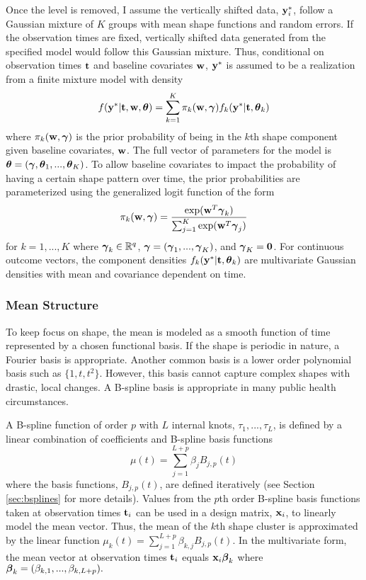 Once the level is removed, I assume the vertically shifted data, $\mathbf y_{i}^{*}$, follow a Gaussian mixture of $K$ groups with mean shape functions and random errors. If the observation times are fixed, vertically shifted data generated from the specified model would follow this Gaussian mixture. Thus, conditional on observation times $\mathbf t$ and baseline covariates $\mathbf w$, $\mathbf y^{*}$ is assumed to be a realization from a finite mixture model with density
\begin{align*}
 f(\mathbf y^{*}|\mathbf t,\mathbf w,\boldsymbol\theta) =  \sum^{K}_{k=1}\pi_{k}(\mathbf w,\boldsymbol \gamma)f_{k}( \mathbf y^{*}|\mathbf t,\boldsymbol\theta_{k})
\end{align*}
where $\pi_{k}(\mathbf w,\boldsymbol \gamma)$ is the prior probability of being in the $k$th shape component given baseline covariates, $\mathbf w$. The full vector of parameters for the model is $\boldsymbol\theta = (\boldsymbol\gamma,\boldsymbol\theta_{1},...,\boldsymbol\theta_{K})$. To allow baseline covariates to impact the probability of having a certain shape pattern over time, the prior probabilities are parameterized using the generalized logit function of the form
$$\pi_{k}(\mathbf w,\boldsymbol\gamma)=\frac{\exp(\mathbf w^{T}\boldsymbol\gamma_{k})}{\sum_{j=1}^{K}\exp(\mathbf w^{T}\boldsymbol\gamma_{j})}$$ 
for $k=1,...,K$ where $\boldsymbol \gamma_{k}\in\mathbb{R}^{q}$, $\boldsymbol\gamma = (\boldsymbol\gamma_{1},...,\boldsymbol\gamma_{K})$, and $\boldsymbol\gamma_{K}=\mathbf 0$. For continuous outcome vectors, the component densities $f_{k}(\mathbf y^{*}|\mathbf t,\boldsymbol\theta_{k})$ are multivariate Gaussian densities with mean and covariance dependent  on time.

\subsubsection{Mean Structure}
To keep focus on shape, the mean is modeled as a smooth function of time represented by a chosen functional basis. If the shape is periodic in nature, a Fourier basis is appropriate. Another common basis is a lower order polynomial basis such as $\{1, t, t^{2}\}$. However, this basis cannot capture complex shapes with drastic, local changes. A B-spline basis is appropriate in many public health circumstances.

A B-spline function of order $p$ with $L$ internal knots, $\tau_{1},...,\tau_{L}$, is defined by a linear combination of coefficients and B-spline basis functions
$$\mu(t) = \sum^{L+p}_{j=1} \beta_j B_{j,p}(t)$$
where the basis functions, $B_{j,p}(t)$, are defined iteratively \cite{deboor1972,cox1972}  (see Section \ref{sec:bsplines} for more details). Values from the $p$th order B-spline basis functions taken at observation times $\mathbf t_{i}$ can be used in a design matrix, $\mathbf x_{i}$, to linearly model the mean vector. Thus, the mean of the $k$th shape cluster is approximated by the linear function $\mu_{k}(t) = \sum^{L+p}_{j=1} \beta_{k,j} B_{j,p}(t)$. In the multivariate form, the mean vector at observation times $\mathbf t_{i}$ equals $\mathbf x_{i}\boldsymbol\beta_{k}$ where $\boldsymbol\beta_{k}=(\beta_{k,1},...,\beta_{k, L+p}).$  

